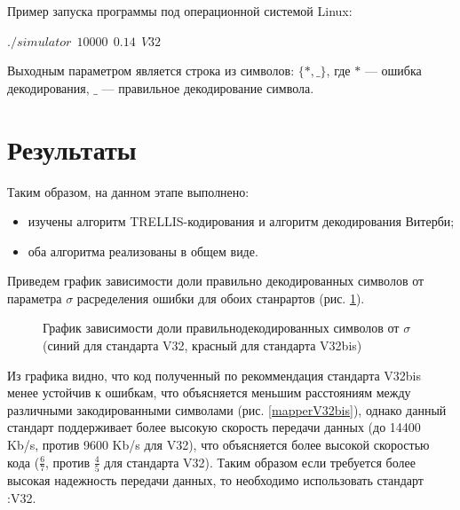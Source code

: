 \documentclass[a4paper,12pt]{article}
\begin{document}
Пример запуска программы под операционной системой Linux: 

$./simulator ~~ 10000~~ 0.14 ~~ V32$

Выходным параметром является строка из символов: $\{*, \_\}$, где $*$ --- ошибка декодирования, $\_$ --- правильное
декодирование символа.

\section{Результаты}

Таким образом, на данном этапе выполнено:
\begin{itemize}
	\item изучены алгоритм TRELLIS-кодирования и алгоритм декодирования Витерби;
	\item оба алгоритма реализованы в общем виде.
\end{itemize}

Приведем график зависимости доли правильно декодированных символов от параметра $\sigma$ расределения ошибки 
для обоих станрартов (рис. \ref{sigmaError}).

\begin{figure}
	\caption{График зависимости доли правильнодекодированных символов от $\sigma$ (синий для стандарта V32,
	красный для стандарта V32bis)}
	\label{sigmaError}
\end{figure}

Из графика видно, что код полученный по рекоммендация стандарта V32bis менее устойчив к ошибкам, что объясняется
меньшим расстояниям между различными закодированными символами (рис. \ref{mapperV32bis}), однако данный стандарт
поддерживает более высокую скорость передачи данных (до 14400 Kb/s, против 9600 Kb/s для V32), что объясняется
более высокой скоростью кода ($\frac{6}{7}$, против $\frac{4}{5}$ для стандарта V32). Таким образом если
требуется более высокая надежность передачи данных, то необходимо использовать стандарт :V32.



\end{document}
